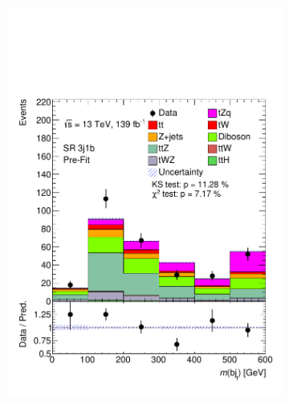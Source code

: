 \begin{figure}[!h] 
  \begin{subfigure}[b]{0.32\linewidth}
    \centering
    \includegraphics[width=\linewidth]{ubonn-thesis/Chapters/Chapters_06/Figure/Input_distribution/SR_3j1b_M_bj.pdf} 
  \end{subfigure}%
  \begin{subfigure}[b]{0.32\linewidth}
    \centering

\end{subfigure}
\end{figure}
